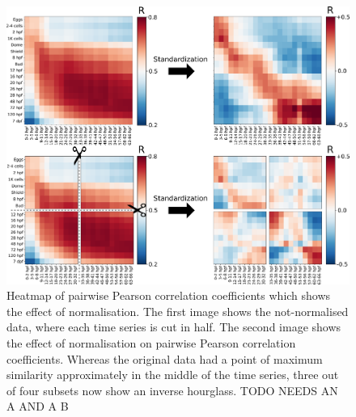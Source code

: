 \begin{figure}[H]
    \includegraphics[width=\linewidth]{ch4.hourglass/images/normalisation.png}
    \caption{Heatmap of pairwise Pearson correlation coefficients which shows the effect of normalisation. The first image shows the not-normalised data, where each time series is cut in half. The second image shows the effect of normalisation on pairwise Pearson correlation coefficients. Whereas the original data had a point of maximum similarity approximately in the middle of the time series, three out of four subsets now show an inverse hourglass. TODO NEEDS AN A AND A B}
    \label{fig:normalisation}
\end{figure}


